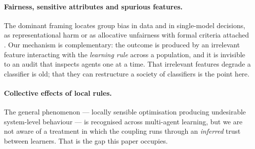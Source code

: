 \paragraph{Fairness, sensitive attributes and spurious features.} The dominant
framing locates group bias in data and in single-model decisions, as
representational harm \citep{blodgett2020language,bender2021dangers} or as
allocative unfairness with formal criteria attached
\citep{dwork2012fairness,hardt2016equality,barocas2023fairness}. Our mechanism is
complementary: the outcome is produced by an irrelevant feature interacting with
the \emph{learning rule} across a population, and it is invisible to an audit
that inspects agents one at a time. That irrelevant features degrade a classifier
is old; that they can restructure a society of classifiers is the point here.

\paragraph{Collective effects of local rules.} The general phenomenon --- locally
sensible optimisation producing undesirable system-level behaviour --- is
recognised across multi-agent learning, but we are not aware of a treatment in
which the coupling runs through an \emph{inferred} trust between learners. That
is the gap this paper occupies.
